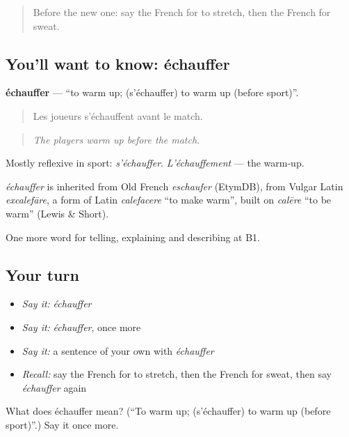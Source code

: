 \label{lesson:FR-C504-echauffer}



\begin{quote}
Before the new one: say the French for to stretch, then the French for sweat.
\end{quote}

\subsection*{You'll want to know: échauffer}
\textbf{échauffer} — \textquotedblleft{}to warm up; (s'échauffer) to warm up (before sport)\textquotedblright{}.

\begin{quote}
Les joueurs s'échauffent avant le match.
\end{quote}

\begin{quote}
\emph{The players warm up before the match.}
\end{quote}

Mostly reflexive in sport: \emph{s'échauffer}. \emph{L'échauffement} — the warm-up.

\begin{cousinweb}
\emph{échauffer} is inherited from Old French \emph{eschaufer} (EtymDB), from Vulgar Latin \emph{excalefāre}, a form of Latin \emph{calefacere} \textquotedblleft{}to make warm\textquotedblright{}, built on \emph{calēre} \textquotedblleft{}to be warm\textquotedblright{} (Lewis \& Short).
\end{cousinweb}

\begin{grammarlens}[title={What you've built}]
One more word for telling, explaining and describing at B1.
\end{grammarlens}

\subsection*{Your turn}
\begin{itemize}
\raggedright
  \item \emph{Say it:} \emph{échauffer}
  \item \emph{Say it:} \emph{échauffer}, once more
  \item \emph{Say it:} a sentence of your own with \emph{échauffer}
  \item \emph{Recall:} say the French for to stretch, then the French for sweat, then say \emph{échauffer} again
\end{itemize}

\begin{tcolorbox}[breakable,colback=teal!4,colframe=teal!35!black,title={Before you move on}]
What does échauffer mean? (\textquotedblleft{}To warm up; (s'échauffer) to warm up (before sport)\textquotedblright{}.) Say it once more.
\end{tcolorbox}
